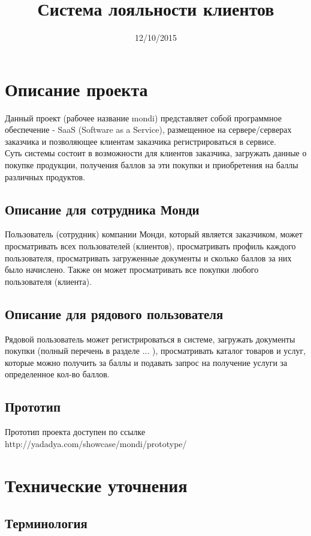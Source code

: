 \documentclass[DIV=calc, paper=a4, fontsize=11pt]{scrartcl} %
\title{Система лояльности клиентов}
\date{12/10/2015}
\begin{document}
\maketitle

\section{Описание проекта}

Данный проект (рабочее название mondi) представляет собой программное обеспечение - SaaS (Software as a Service), размещенное на сервере/серверах заказчика и позволяющее клиентам заказчика регистрироваться в сервисе. \\[0.5cm]
Суть системы состоит в возможности для клиентов заказчика, загружать данные о покупке продукции, получения баллов за эти покупки и приобретения на баллы различных продуктов.

\subsection{Описание для сотрудника Монди}
Пользователь (сотрудник) компании Монди, который является заказчиком, может просматривать всех пользователей (клиентов), просматривать профиль каждого пользователя, просматривать загруженные документы и сколько баллов за них было начислено. Также он может просматривать все покупки любого пользователя (клиента).

\subsection{Описание для рядового пользователя}
Рядовой пользователь может регистрироваться в системе, загружать документы покупки (полный перечень в разделе ... ), просматривать каталог товаров и услуг, которые можно получить за баллы и подавать запрос на получение услуги за определенное кол-во баллов.

\subsection{Прототип}
Прототип проекта доступен по ссылке http://yadadya.com/showcase/mondi/prototype/

\section{Технические уточнения}

\subsection{Терминология}
        
\end{document}
